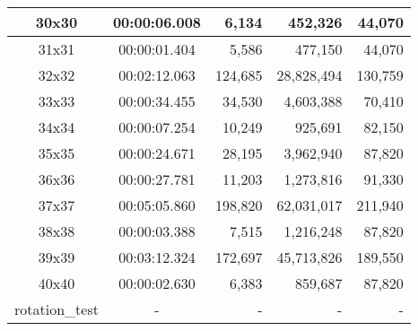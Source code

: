 \begin{center}
\begin{tabular}{|c|c|r|r|r|}
		30x30 & 00:00:06.008 & 6,134 & 452,326 & 44,070 \\ \hline
		31x31 & 00:00:01.404 & 5,586 & 477,150 & 44,070 \\ \hline
		32x32 & 00:02:12.063 & 124,685 & 28,828,494 & 130,759 \\ \hline
		33x33 & 00:00:34.455 & 34,530 & 4,603,388 & 70,410 \\ \hline
		34x34 & 00:00:07.254 & 10,249 & 925,691 & 82,150 \\ \hline
		35x35 & 00:00:24.671 & 28,195 & 3,962,940 & 87,820 \\ \hline
		36x36 & 00:00:27.781 & 11,203 & 1,273,816 & 91,330 \\ \hline
		37x37 & 00:05:05.860 & 198,820 & 62,031,017 & 211,940 \\ \hline
		38x38 & 00:00:03.388 & 7,515 & 1,216,248 & 87,820 \\ \hline
		39x39 & 00:03:12.324 & 172,697 & 45,713,826 & 189,550 \\ \hline
		40x40 & 00:00:02.630 & 6,383 & 859,687 & 87,820 \\ \hline
		rotation\_test & - & - & - & - \\ \hline

    \end{tabular}
\end{center}
